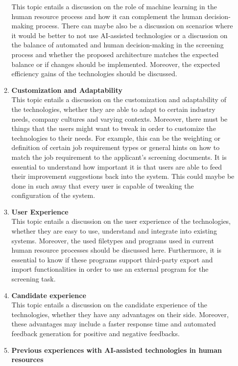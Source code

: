 \documentclass[draft,final]{thesisclass} %
\begin{document}
\begin{enumerate}
\begin{enumerate}
        This topic entails a discussion on the role of machine learning in the human resource process and how it can complement the human decision-making process.
        There can maybe also be a discussion on scenarios where it would be better to not use \acs{AI}-assisted technologies or a discussion on the balance of automated and human decision-making in the screening process and whether the proposed architecture matches the expected balance or if changes should be implemented.
        Moreover, the expected efficiency gains of the technologies should be discussed.
        \item \textbf{Customization and Adaptability}\\
        This topic entails a discussion on the customization and adaptability of the technologies, whether they are able to adapt to certain industry needs, company cultures and varying contexts.
        Moreover, there must be things that the users might want to tweak in order to customize the technologies to their needs.
        For example, this can be the weighting or definition of certain job requirement types or general hints on how to match the job requirement to the applicant's screening documents.
        It is essential to understand how important it is that users are able to feed their improvement suggestions back into the system.
        This could maybe be done in such away that every user is capable of tweaking the configuration of the system.
        \item \textbf{User Experience}\\
        This topic entails a discussion on the user experience of the technologies, whether they are easy to use, understand and integrate into existing systems.
        Moreover, the used filetypes and programs used in current human resource processes should be discussed here.
        Furthermore, it is essential to know if these programs support third-party export and import functionalities in order to use an external program for the screening task.
        \item \textbf{Candidate experience}\\
        This topic entails a discussion on the candidate experience of the technologies, whether they have any advantages on their side.
        Moreover, these advantages may include a faster response time and automated feedback generation for positive and negative feedbacks.
        \item \textbf{Previous experiences with \acs{AI}-assisted technologies in human resources}\\

\end{enumerate}
\end{enumerate}
\end{document}
